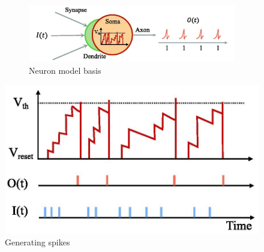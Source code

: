 \documentclass[11pt]{article}
\begin{document}
\begin{figure}[H]
  \begin{minipage}{0.5\textwidth}
    \begin{figure}[H]
      \begin{center}
        \includegraphics{image/neuronmodel.jpg}
        \caption{Neuron model basis\cite{LIAO2023126470}}
        \label{fig:neuronmodel}
      \end{center}
    \end{figure}
  \end{minipage}
  \hspace{0.5cm}
  \begin{minipage}{0.5\textwidth}
    \begin{center}
      \includegraphics{image/generating_spikes.jpg}
      \caption{Generating spikes\cite{LIAO2023126470}}
      \label{fig:generating_spikes}
    \end{center}
  \end{minipage}
\end{figure}

\end{document}
